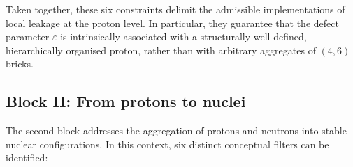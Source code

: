 \documentclass[11pt,a4paper]{article}
\theoremstyle{definition}
\begin{document}
Taken together, these six constraints delimit the admissible implementations of local leakage at the proton level. In particular, they guarantee that the defect parameter $\varepsilon$ is intrinsically associated with a structurally well-defined, hierarchically organised proton, rather than with arbitrary aggregates of $(4,6)$ bricks.\cite{Combinatorial_Proton_v2_2026,PDL_Global_Mapping_2026}

\subsection{Block II: From protons to nuclei}

The second block addresses the aggregation of protons and neutrons into stable nuclear configurations. In this context, six distinct conceptual filters can be identified:\cite{Exponent_18_PDL_2026}
\end{document}
